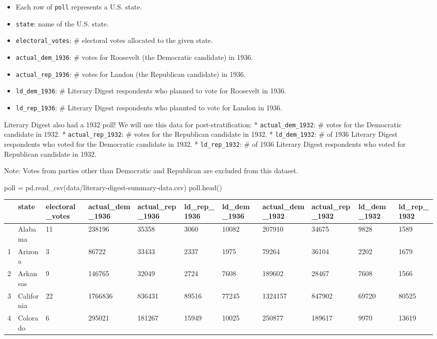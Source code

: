 \documentclass[
  letterpaper,
  DIV=11,
  numbers=noendperiod]{scrreprt}
\newenvironment{Shaded}{\begin{snugshade}}{\end{snugshade}}
\newcommand{\NormalTok}[1]{\textcolor[rgb]{0.00,0.23,0.31}{#1}}
\newcommand{\OperatorTok}[1]{\textcolor[rgb]{0.37,0.37,0.37}{#1}}
\newcommand{\StringTok}[1]{\textcolor[rgb]{0.13,0.47,0.30}{#1}}
\providecommand{\tightlist}{%
  \setlength{\itemsep}{0pt}\setlength{\parskip}{0pt}}\usepackage{longtable,booktabs,array}
\begin{document}
\begin{itemize}
\tightlist
\item
  Each row of \texttt{poll} represents a U.S. state.
\item
  \texttt{state}: name of the U.S. state.
\item
  \texttt{electoral\_votes}: \# electoral votes allocated to the given
  state.
\item
  \texttt{actual\_dem\_1936}: \# votes for Roosevelt (the Democratic
  candidate) in 1936.
\item
  \texttt{actual\_rep\_1936}: \# votes for Landon (the Republican
  candidate) in 1936.
\item
  \texttt{ld\_dem\_1936}: \# Literary Digest respondents who planned to
  vote for Roosevelt in 1936.
\item
  \texttt{ld\_rep\_1936}: \# Literary Digest respondents who plannted to
  vote for Landon in 1936.
\end{itemize}

Literary Digest also had a 1932 poll! We will use this data for
post-stratification: * \texttt{actual\_dem\_1932}: \# votes for the
Democratic candidate in 1932. * \texttt{actual\_rep\_1932}: \# votes for
the Republican candidate in 1932. * \texttt{ld\_dem\_1932}: \# of 1936
Literary Digest respondents who voted for the Democratic candidate in
1932. * \texttt{ld\_rep\_1932}: \# of 1936 Literary Digest respondents
who voted for Republican candidate in 1932.

Note: Votes from parties other than Democratic and Republican are
excluded from this dataset.

\begin{Shaded}
\begin{Highlighting}[]
\NormalTok{poll }\OperatorTok{=}\NormalTok{ pd.read\_csv(}\StringTok{\textquotesingle{}data/literary{-}digest{-}summary{-}data.csv\textquotesingle{}}\NormalTok{)}
\NormalTok{poll.head()}
\end{Highlighting}
\end{Shaded}

\begin{longtable}[]{@{}lllllllllll@{}}
\toprule\noalign{}
& state & electoral\_votes & actual\_dem\_1936 & actual\_rep\_1936 &
ld\_rep\_1936 & ld\_dem\_1936 & actual\_dem\_1932 & actual\_rep\_1932 &
ld\_dem\_1932 & ld\_rep\_1932 \\
\midrule\noalign{}
\endhead
\bottomrule\noalign{}
\endlastfoot
0 & Alabama & 11 & 238196 & 35358 & 3060 & 10082 & 207910 & 34675 & 9828
& 1589 \\
1 & Arizona & 3 & 86722 & 33433 & 2337 & 1975 & 79264 & 36104 & 2202 &
1679 \\
2 & Arkansas & 9 & 146765 & 32049 & 2724 & 7608 & 189602 & 28467 & 7608
& 1566 \\
3 & California & 22 & 1766836 & 836431 & 89516 & 77245 & 1324157 &
847902 & 69720 & 80525 \\
4 & Colorado & 6 & 295021 & 181267 & 15949 & 10025 & 250877 & 189617 &
9970 & 13619 \\
\end{longtable}
\end{document}
